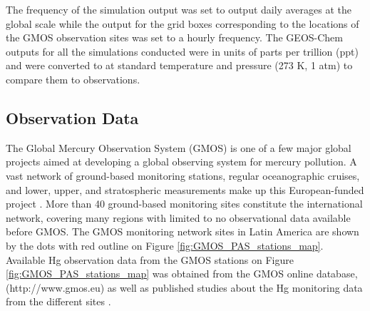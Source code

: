 \begin{table}[H]
\label{tab:geos_chem_simulation_description}

\centering
{}

\end{table}

\begin{flushleft}

 The frequency of the simulation output was set to output daily \hg averages at the global scale while the \hg output for the grid boxes corresponding to the locations of the GMOS observation sites was set to a hourly frequency. The GEOS-Chem outputs for all the simulations conducted were in units of parts per trillion (ppt) and were converted to \nang at standard temperature and pressure (273 K, 1 atm) to compare them to observations.
\end{flushleft}

\subsection{Observation Data}

\begin{flushleft}
 The Global Mercury Observation System (GMOS) is one of a few major global projects aimed at developing a global observing system for mercury pollution. A vast network of ground-based monitoring stations, regular oceanographic cruises, and lower, upper, and stratospheric measurements make up this European-funded project \cite{sprovieri_atmospheric_2016,koenig_seasonal_2021}. More than 40 ground-based monitoring sites constitute the international network, covering many regions with limited to no observational data available before GMOS\cite{sprovieri_atmospheric_2016}. The GMOS monitoring network sites in Latin America are shown by the dots with red outline on Figure \ref{fig:GMOS_PAS_stations_map}. Available Hg observation data from the GMOS stations on Figure  \ref{fig:GMOS_PAS_stations_map} was obtained from the GMOS online database,(http://www.gmos.eu) as well as published studies about the Hg monitoring data from the different sites \cite{koenig_seasonal_2021}.  
\end{flushleft}

